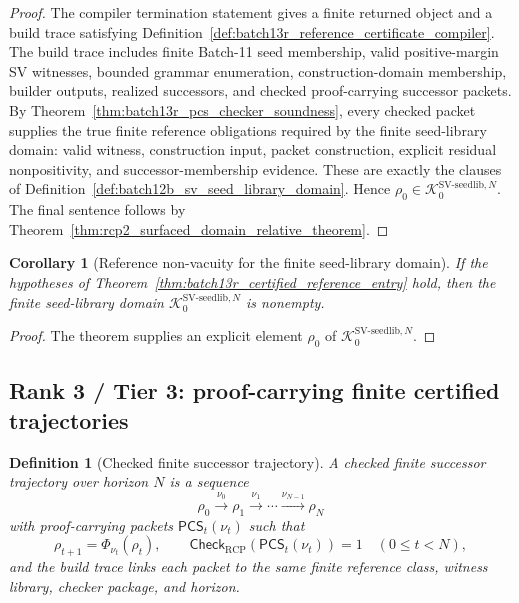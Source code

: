 \documentclass[11pt]{article}
\newtheorem{corollary}[theorem]{Corollary}
\newtheorem{definition}[theorem]{Definition}
\newcommand{\1}{\mathbf{1}}
\newcommand{\RCP}{\mathrm{RCP}}
\providecommand{\Kcal}{\mathcal{K}}
\begin{document}
\begin{proof}
The compiler termination statement gives a finite returned object and a build trace satisfying Definition~\ref{def:batch13r_reference_certificate_compiler}.  The build trace includes finite Batch-11 seed membership, valid positive-margin SV witnesses, bounded grammar enumeration, construction-domain membership, builder outputs, realized successors, and checked proof-carrying successor packets.  By Theorem~\ref{thm:batch13r_pcs_checker_soundness}, every checked packet supplies the true finite reference obligations required by the finite seed-library domain: valid witness, construction input, packet construction, explicit residual nonpositivity, and successor-membership evidence.  These are exactly the clauses of Definition~\ref{def:batch12b_sv_seed_library_domain}.  Hence \(\rho_0\in\Kcal_0^{\mathrm{SV\mbox{-}seedlib},N}\).  The final sentence follows by Theorem~\ref{thm:rcp2_surfaced_domain_relative_theorem}.
\end{proof}

\begin{corollary}[Reference non-vacuity for the finite seed-library domain]
\label{cor:batch13r_reference_nonvacuity}
If the hypotheses of Theorem~\ref{thm:batch13r_certified_reference_entry} hold, then the finite seed-library domain \(\Kcal_0^{\mathrm{SV\mbox{-}seedlib},N}\) is nonempty.
\end{corollary}

\begin{proof}
The theorem supplies an explicit element \(\rho_0\) of \(\Kcal_0^{\mathrm{SV\mbox{-}seedlib},N}\).
\end{proof}

\subsection{Rank 3 / Tier 3: proof-carrying finite certified trajectories}

\begin{definition}[Checked finite successor trajectory]
\label{def:batch13r_checked_finite_successor_trajectory}
A checked finite successor trajectory over horizon \(N\) is a sequence
\[
\rho_0\xrightarrow{\nu_0}\rho_1\xrightarrow{\nu_1}\cdots\xrightarrow{\nu_{N-1}}\rho_N
\]
with proof-carrying packets \(\mathsf{PCS}_t(\nu_t)\) such that
\[
\rho_{t+1}=\Phi_{\nu_t}(\rho_t),
\qquad
\mathsf{Check}_{\RCP}(\mathsf{PCS}_t(\nu_t))=1
\quad(0\le t<N),
\]
and the build trace links each packet to the same finite reference class, witness library, checker package, and horizon.
\end{definition}
\end{document}
